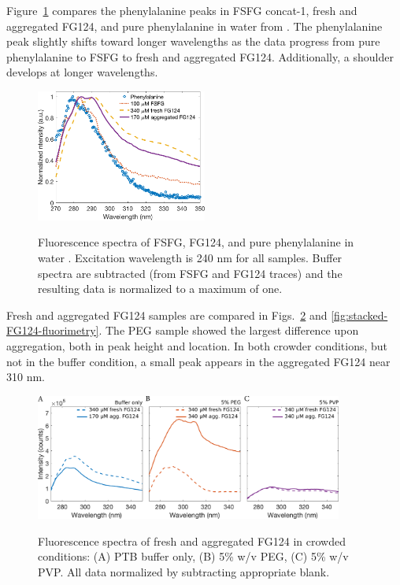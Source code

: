 Figure~\ref{fig:phe-comparison} compares the phenylalanine peaks in FSFG concat-1, fresh and aggregated FG124, and pure phenylalanine in water from \cite{prahl95}.  The phenylalanine peak slightly shifts toward longer wavelengths as the data progress from pure  phenylalanine to FSFG to fresh and aggregated FG124.  Additionally, a shoulder develops at longer wavelengths.

\begin{figure}
\caption[Fluorescence spectra of FSFG, FG124, and phenylalanine.]{Fluorescence spectra of FSFG, FG124, and pure phenylalanine in water \cite{prahl95}. Excitation wavelength is 240 nm for all samples. Buffer spectra are subtracted (from FSFG and FG124 traces) and the resulting data is normalized to a maximum of one. \\}
\centering
\includegraphics[width=0.5\textwidth]{figs/ch05/phe-comparison.pdf}
\label{fig:phe-comparison}
\end{figure}

Fresh and aggregated FG124 samples are compared in Figs.~\ref{fig:FG124-fresh-vs-agg} and \ref{fig:stacked-FG124-fluorimetry}.  The PEG sample showed the largest difference upon aggregation, both in peak height and location.  In both crowder conditions, but not in the buffer condition, a small peak appears in the aggregated FG124 near 310 nm.

\begin{figure}
\caption[FG124 fluorescence in crowded conditions.]{Fluorescence spectra of fresh and aggregated FG124 in crowded conditions: (A) PTB buffer only, (B) 5\% w/v PEG, (C) 5\% w/v PVP.  All data normalized by subtracting appropriate blank.}
\centering
\includegraphics[width=0.9\textwidth]{figs/ch05/FG124-fresh-vs-agg.pdf}
\label{fig:FG124-fresh-vs-agg}
\end{figure}

